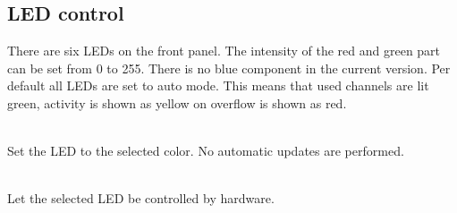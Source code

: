         \subsection{LED control}

            There are six LEDs on the front panel. The intensity of the red and green part can be set from 0 to 255. There is no blue component in the current version. Per default all LEDs are set to auto mode. This means that used channels are lit green, activity is shown as yellow on overflow is shown as red.\par

                \\
            Set the LED to the selected color. No automatic updates are performed.\par

             \\
            Let the selected LED be controlled by hardware.